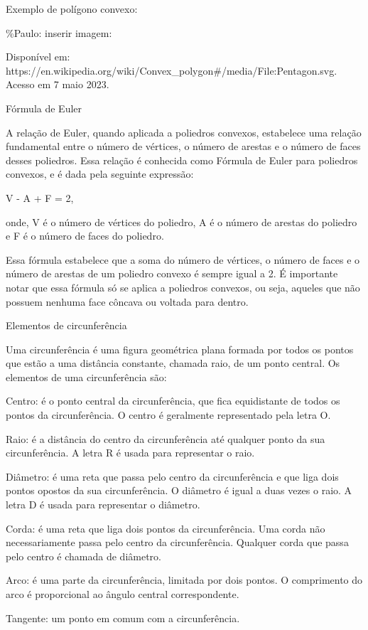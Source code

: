 Exemplo de polígono convexo:

\%Paulo: inserir imagem:

Disponível em:
https://en.wikipedia.org/wiki/Convex\_polygon\#/media/File:Pentagon.svg.
Acesso em 7 maio 2023.

Fórmula de Euler

A relação de Euler, quando aplicada a poliedros convexos, estabelece uma
relação fundamental entre o número de vértices, o número de arestas e o
número de faces desses poliedros. Essa relação é conhecida como Fórmula
de Euler para poliedros convexos, e é dada pela seguinte expressão:

V - A + F = 2,

onde, V é o número de vértices do poliedro, A é o número de arestas do
poliedro e F é o número de faces do poliedro.

Essa fórmula estabelece que a soma do número de vértices, o número de
faces e o número de arestas de um poliedro convexo é sempre igual a 2. É
importante notar que essa fórmula só se aplica a poliedros convexos, ou
seja, aqueles que não possuem nenhuma face côncava ou voltada para
dentro.

Elementos de circunferência

Uma circunferência é uma figura geométrica plana formada por todos os
pontos que estão a uma distância constante, chamada raio, de um ponto
central. Os elementos de uma circunferência são:

Centro: é o ponto central da circunferência, que fica equidistante de
todos os pontos da circunferência. O centro é geralmente representado
pela letra O.

Raio: é a distância do centro da circunferência até qualquer ponto da
sua circunferência. A letra R é usada para representar o raio.

Diâmetro: é uma reta que passa pelo centro da circunferência e que liga
dois pontos opostos da sua circunferência. O diâmetro é igual a duas
vezes o raio. A letra D é usada para representar o diâmetro.

Corda: é uma reta que liga dois pontos da circunferência. Uma corda não
necessariamente passa pelo centro da circunferência. Qualquer corda que
passa pelo centro é chamada de diâmetro.

Arco: é uma parte da circunferência, limitada por dois pontos. O
comprimento do arco é proporcional ao ângulo central correspondente.

Tangente: um ponto em comum com a circunferência.

